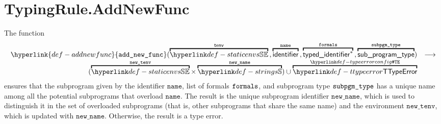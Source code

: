 \documentclass{book}
\newcommand\addnewfunc[0]{\hyperlink{def-addnewfunc}{\texttt{add\_new\_func}}}
\newcommand\newtenv[0]{\texttt{new\_tenv}}
\newcommand\name[0]{\texttt{name}}
\newcommand\newname[0]{\texttt{new\_name}}
\begin{document}
\section{TypingRule.AddNewFunc \label{sec:TypingRule.AddNewFunc}}
\hypertarget{def-addnewfunc}{}
The function
\[
  \begin{array}{rl}
  \addnewfunc(
    \overname{\staticenvs}{\tenv} \aslsep
    \overname{\identifier}{\name} \aslsep
    \overname{\typedidentifier^*}{\formals} \aslsep
    \overname{\subprogramtype}{\subpgmtype})
  & \aslto\\
  (\overname{\staticenvs}{\newtenv} \times \overname{\Strings}{\newname})
  \cup \overname{\TTypeError}{\TypeErrorConfig} &
  \end{array}
\]
ensures that the subprogram given by the identifier $\name$, list of formals $\texttt{formals}$,
and subprogram type $\texttt{subpgm\_type}$ has a unique name among all the potential subprograms
that overload $\name$.
The result is the unique subprogram identifier $\newname$, which is used to distinguish it in the set
of overloaded subprograms (that is, other subprograms that share the same name)
and the environment $\newtenv$, which is updated with $\newname$.
Otherwise, the result is a type error.
\end{document}
